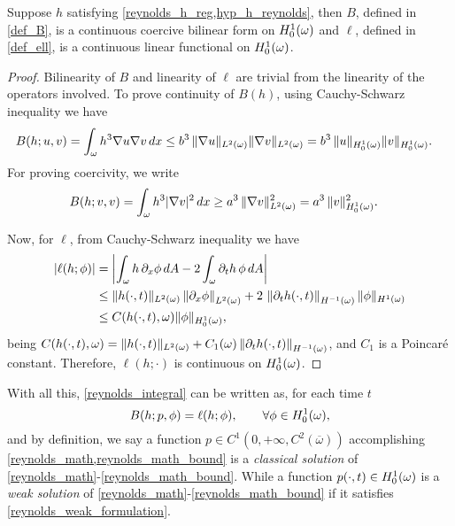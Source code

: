 \begin{proposition}Suppose $h$ satisfying \eqref*{reynolds_h_reg,hyp_h_reynolds}, then
$B$, defined in \eqref*{def_B}, is a continuous coercive bilinear form on ${H_0^1(\omega)}$ and $\ell$, defined in \eqref*{def_ell}, is a continuous linear functional on ${H_0^1(\omega)}$.
\begin{proof}
Bilinearity of $B$ and linearity of $\ell$ are trivial from the linearity of the operators involved. To prove continuity of $B(h)$, using Cauchy-Schwarz inequality we have
\begin{align}
B(h;u,v)=\int_\omega h^3\nabla u \nabla v\,dx&\leq b^3\,\|\nabla u\|_{L^{2}(\omega)} \|\nabla v\|_{L^{2}(\omega)}=b^3\,\|  u\|_{H_0^1(\omega)} \|v\|_{H_0^1(\omega)}.\nonumber
\end{align}
For proving coercivity, we write
\begin{align}
B(h;v,v)=\int_\omega h^3| \nabla v|^2\,dx&\geq a^3\, \|\nabla v\|^2_\lpom{2}=a^3\, \|v\|^2_\hzerooneom.\label{eq:coer_c3}
\end{align}

Now, for $\ell$, from Cauchy-Schwarz inequality we have
\begin{align}
|\ell(h;\phi)|&=\left|\int_\omega h\,\partial_x\phi\,dA-2 \int_\omega \partial_t h\,\phi\,dA\right|\\&\leq\|h(\cdot,t)\|_\lpom{2} \left\|\partial_x\phi\right\|_\lpom{2}+2\,\left\|\partial_t h(\cdot,t)\right\|_{H^{-1}(\omega)}\|\phi\|_{H^1(\omega)}\label{eq:est_l0}\\&\leq C(h(\cdot,t),\omega) \|\phi\|_\hzerooneom,\label{eq:est_l}
\end{align}
being $C(h(\cdot,t),\omega)=\|h(\cdot,t)\|_{L^{2}(\omega)} +C_1(\omega)\left\|\partial_t h(\cdot,t)\right\|_{H^{-1}(\omega)}$, and $C_1$ is a Poincaré constant. Therefore, $\ell(h;\cdot)$ is continuous on ${H_0^1(\omega)}$.
\end{proof}
\end{proposition}
With all this, \eqref{reynolds_integral} can be written as, for each time $t$
\begin{equation}
B(h;p,\phi)=\ell(h;\phi),\qquad\forall \phi \in \hzerooneom,\label{eq:reynolds_weak_formulation}
\end{equation}
and by definition, we say a function $p\in C^1\left(0,+\infty,C^2(\overline{\omega})\right)$ accomplishing \eqref{reynolds_math,reynolds_math_bound} is a \emph{classical solution} of \eqref*{reynolds_math}-\eqref*{reynolds_math_bound}. While a function $p(\cdot,t)\in{H_0^1(\omega)}$ is a \emph{weak solution} of  \eqref*{reynolds_math}-\eqref*{reynolds_math_bound} if it satisfies \eqref{reynolds_weak_formulation}.

